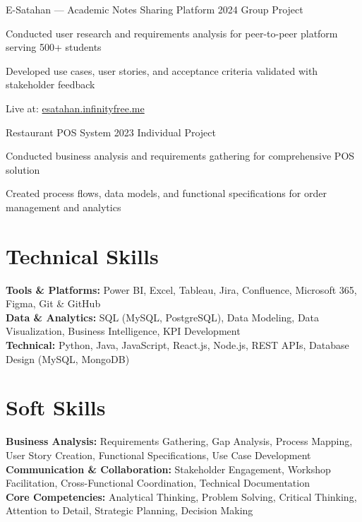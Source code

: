 \documentclass[letterpaper,10.8pt]{article}
\begin{document}
\vspace{8pt}

{E-Satahan — Academic Notes Sharing Platform}
{2024}
{Group Project}{
  \item Conducted user research and requirements analysis for peer-to-peer platform serving 500+ students
  \item Developed use cases, user stories, and acceptance criteria validated with stakeholder feedback
  \item Live at: \href{https://esatahan.infinityfree.me}{esatahan.infinityfree.me}
}

\vspace{8pt}

{Restaurant POS System}
{2023}
{Individual Project}{
  \item Conducted business analysis and requirements gathering for comprehensive POS solution
  \item Created process flows, data models, and functional specifications for order management and analytics
}

\newpage

\section{Technical Skills}
\vspace{-1pt}

\textbf{Tools \& Platforms:} Power BI, Excel, Tableau, Jira, Confluence, Microsoft 365, Figma, Git \& GitHub\\[4pt]
\textbf{Data \& Analytics:} SQL (MySQL, PostgreSQL), Data Modeling, Data Visualization, Business Intelligence, KPI Development\\[4pt]
\textbf{Technical:} Python, Java, JavaScript, React.js, Node.js, REST APIs, Database Design (MySQL, MongoDB)

\section{Soft Skills}
\vspace{-1pt}

\textbf{Business Analysis:} Requirements Gathering, Gap Analysis, Process Mapping, User Story Creation, Functional Specifications, Use Case Development\\[4pt]
\textbf{Communication \& Collaboration:} Stakeholder Engagement, Workshop Facilitation, Cross-Functional Coordination, Technical Documentation\\[4pt]
\textbf{Core Competencies:} Analytical Thinking, Problem Solving, Critical Thinking, Attention to Detail, Strategic Planning, Decision Making
\end{document}
